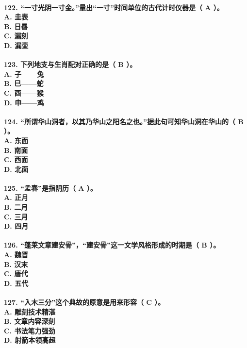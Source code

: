 \documentclass[UTF8]{ctexart} %
\begin{document}
\paragraph{
122. “一寸光阴一寸金。”量出“一寸”时间单位的古代计时仪器是（ \color{red}A\color{black} ）。 \\
    A. 圭表 \\
    B. 日晷 \\
    C. 漏刻 \\
    D. 漏壶
}
\paragraph{
123. 下列地支与生肖配对正确的是（ \color{red}B\color{black} ）。 \\
    A. 子——兔 \\
    B. 巳——蛇 \\
    C. 酉——猴 \\
    D. 申——鸡
}
\paragraph{
124. “所谓华山洞者，以其乃华山之阳名之也。”据此句可知华山洞在华山的（ \color{red}B\color{black} ）。 \\
    A. 东面 \\
    B. 南面 \\
    C. 西面 \\
    D. 北面
}
\paragraph{
125. “孟春”是指阴历（ \color{red}A\color{black} ）。 \\
    A. 正月 \\
    B. 二月 \\
    C. 三月 \\
    D. 四月
}
\paragraph{
126. “蓬莱文章建安骨”，“建安骨”这一文学风格形成的时期是（ \color{red}B\color{black} ）。 \\
    A. 魏晋 \\
    B. 汉末 \\
    C. 唐代 \\
    D. 五代
}
\paragraph{
127. “入木三分”这个典故的原意是用来形容（ \color{red}C\color{black} ）。 \\
    A. 雕刻技术精湛 \\
    B. 文章内容深刻 \\
    C. 书法笔力强劲 \\
    D. 射箭本领高超
}
\end{document}
